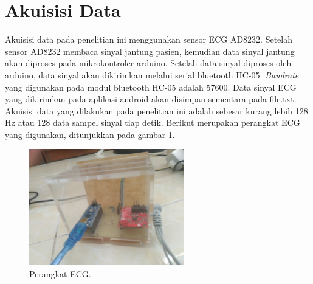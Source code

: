 \section{Akuisisi Data}
\vspace{1ex}

Akuisisi data pada penelitian ini menggunakan sensor ECG AD8232. Setelah sensor AD8232 membaca sinyal jantung pasien, kemudian data sinyal jantung akan diproses pada mikrokontroler arduino. Setelah data sinyal diproses oleh arduino, data sinyal akan dikirimkan melalui serial bluetooth HC-05. \textit{Baudrate} yang digunakan pada modul bluetooth HC-05 adalah 57600. Data sinyal ECG yang dikirimkan pada aplikasi android akan disimpan sementara pada file.txt. Akuisisi data yang dilakukan pada penelitian ini adalah sebesar kurang lebih 128 Hz atau 128 data sampel sinyal tiap detik. Berikut merupakan perangkat ECG yang digunakan, ditunjukkan pada gambar \ref{fig:3.4.1}.
\begin{figure}[H] \centering
	\includegraphics[width=0.6\textwidth]{img/fotoperangkat1.jpg}
	\caption{Perangkat ECG.}
	\label{fig:3.4.1}
\end{figure}
\vspace{1ex}

